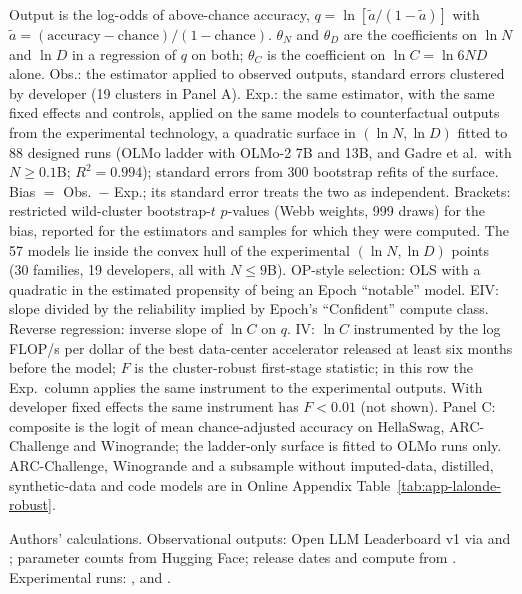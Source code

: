 \begin{table}[tp]
\begin{tablenotes}
Output is the log-odds of above-chance accuracy, $q=\ln[\tilde a/(1-\tilde a)]$ with $\tilde a=(\text{accuracy}-\text{chance})/(1-\text{chance})$. $\theta_N$ and $\theta_D$ are the coefficients on $\ln N$ and $\ln D$ in a regression of $q$ on both; $\theta_C$ is the coefficient on $\ln C=\ln 6ND$ alone. Obs.: the estimator applied to observed outputs, standard errors clustered by developer (19 clusters in Panel A). Exp.: the same estimator, with the same fixed effects and controls, applied on the same models to counterfactual outputs from the experimental technology, a quadratic surface in $(\ln N,\ln D)$ fitted to 88 designed runs (OLMo ladder with OLMo-2 7B and 13B, and Gadre et al.\ with $N\geq 0.1$B; $R^2=0.994$); standard errors from 300 bootstrap refits of the surface. Bias $=$ Obs.\ $-$ Exp.; its standard error treats the two as independent. Brackets: restricted wild-cluster bootstrap-$t$ $p$-values (Webb weights, 999 draws) for the bias, reported for the estimators and samples for which they were computed. The 57 models lie inside the convex hull of the experimental $(\ln N,\ln D)$ points (30 families, 19 developers, all with $N\le 9$B). OP-style selection: OLS with a quadratic in the estimated propensity of being an Epoch ``notable'' model. EIV: slope divided by the reliability implied by Epoch's ``Confident'' compute class. Reverse regression: inverse slope of $\ln C$ on $q$. IV: $\ln C$ instrumented by the log FLOP/s per dollar of the best data-center accelerator released at least six months before the model; $F$ is the cluster-robust first-stage statistic; in this row the Exp.\ column applies the same instrument to the experimental outputs. With developer fixed effects the same instrument has $F<0.01$ (not shown). Panel C: composite is the logit of mean chance-adjusted accuracy on HellaSwag, ARC-Challenge and Winogrande; the ladder-only surface is fitted to OLMo runs only. ARC-Challenge, Winogrande and a subsample without imputed-data, distilled, synthetic-data and code models are in Online Appendix Table~\ref{tab:app-lalonde-robust}.
\end{tablenotes}
\begin{tablenotes}[Source]
Authors' calculations. Observational outputs: Open LLM Leaderboard v1 via \citet{ruan2024observational} and \citet{maiapolo2024sloth}; parameter counts from Hugging Face; release dates and compute from \citet{epochai2026data}. Experimental runs: \citet{bhagia2024establishing}, \citet{teamolmo2024olmo} and \citet{gadre2024language}.
\end{tablenotes}
\end{table}
